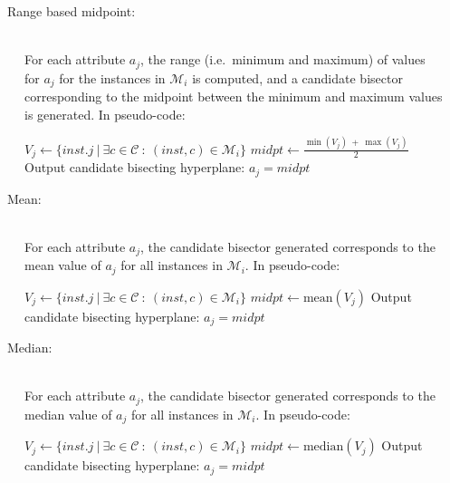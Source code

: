 \documentclass[a4paper,12pt]{article} %
\newcommand{\mcl}[1]{\mathcal{#1}}
\begin{document}
\begin{description}

\item[~~~Range based midpoint:] \ \\
    For each attribute $a_j$, 
    the range (i.e.\ minimum and maximum) of values for $a_j$ 
        for the instances in $\mcl{M}_i$ is computed, 
        and a candidate bisector corresponding to the midpoint between the 
        minimum and maximum values is generated.
    In pseudo-code:
    \begin{algorithmic}
        \State $V_j \gets \{ inst.j ~|~ \exists c \in \mcl{C} ~:~ (inst,c) \in \mcl{M}_i \}$
        \State $midpt \gets \frac{\min(V_j) ~+~ \max(V_j)}{2}$
        \State Output candidate bisecting hyperplane: $a_j = midpt $
    \EndFor
    \end{algorithmic}
    
\item[~~~Mean:]  \ \\
    For each attribute $a_j$, 
        the candidate bisector generated corresponds to 
        the mean value of $a_j$ 
        for all instances in $\mcl{M}_i$.
    In pseudo-code:
    \begin{algorithmic}
        \State $V_j \gets \{ inst.j ~|~ \exists c \in \mcl{C} ~:~ (inst,c) \in \mcl{M}_i \}$
        \State $midpt \gets \textrm{mean}(V_j)$
        \State Output candidate bisecting hyperplane: $a_j = midpt $
    \EndFor
    \end{algorithmic}        
        

\item[~~~Median:]  \ \\
    For each attribute $a_j$, 
        the candidate bisector generated corresponds to 
        the median value of $a_j$ 
        for all instances in $\mcl{M}_i$.
    In pseudo-code:
    \begin{algorithmic}
        \State $V_j \gets \{ inst.j ~|~ \exists c \in \mcl{C} ~:~ (inst,c) \in \mcl{M}_i \}$
        \State $midpt \gets \textrm{median}(V_j)$
        \State Output candidate bisecting hyperplane: $a_j = midpt $
    \EndFor
    \end{algorithmic}  
    

\end{description}
\end{document}
